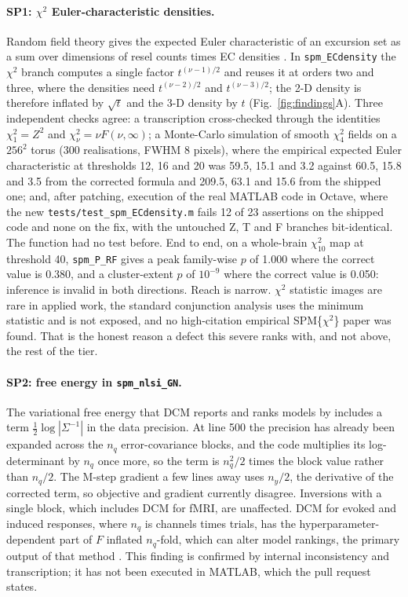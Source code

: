 \documentclass[11pt]{article}
\newcommand{\code}[1]{\texttt{#1}}
\begin{document}
\paragraph{SP1: $\chi^2$ Euler-characteristic densities.} Random field theory gives the expected Euler characteristic of an excursion set as a sum over dimensions of resel counts times EC densities \cite{worsley1994}. In \code{spm\_ECdensity} the $\chi^2$ branch computes a single factor $t^{(\nu-1)/2}$ and reuses it at orders two and three, where the densities need $t^{(\nu-2)/2}$ and $t^{(\nu-3)/2}$; the 2-D density is therefore inflated by $\sqrt t$ and the 3-D density by $t$ (Fig.~\ref{fig:findings}A). Three independent checks agree: a transcription cross-checked through the identities $\chi^2_1 = Z^2$ and $\chi^2_\nu = \nu F(\nu,\infty)$; a Monte-Carlo simulation of smooth $\chi^2_4$ fields on a $256^2$ torus (300 realisations, FWHM 8 pixels), where the empirical expected Euler characteristic at thresholds 12, 16 and 20 was 59.5, 15.1 and 3.2 against 60.5, 15.8 and 3.5 from the corrected formula and 209.5, 63.1 and 15.6 from the shipped one; and, after patching, execution of the real MATLAB code in Octave, where the new \code{tests/test\_spm\_ECdensity.m} fails 12 of 23 assertions on the shipped code and none on the fix, with the untouched Z, T and F branches bit-identical. The function had no test before. End to end, on a whole-brain $\chi^2_{10}$ map at threshold 40, \code{spm\_P\_RF} gives a peak family-wise $p$ of 1.000 where the correct value is 0.380, and a cluster-extent $p$ of $10^{-9}$ where the correct value is 0.050: inference is invalid in both directions. Reach is narrow. $\chi^2$ statistic images are rare in applied work, the standard conjunction analysis uses the minimum statistic and is not exposed, and no high-citation empirical SPM\{$\chi^2$\} paper was found. That is the honest reason a defect this severe ranks with, and not above, the rest of the tier.

\paragraph{SP2: free energy in \code{spm\_nlsi\_GN}.} The variational free energy that DCM reports and ranks models by includes a term $\tfrac12\log|\Sigma^{-1}|$ in the data precision. At line 500 the precision has already been expanded across the $n_q$ error-covariance blocks, and the code multiplies its log-determinant by $n_q$ once more, so the term is $n_q^2/2$ times the block value rather than $n_q/2$. The M-step gradient a few lines away uses $n_y/2$, the derivative of the corrected term, so objective and gradient currently disagree. Inversions with a single block, which includes DCM for fMRI, are unaffected. DCM for evoked and induced responses, where $n_q$ is channels times trials, has the hyperparameter-dependent part of $F$ inflated $n_q$-fold, which can alter model rankings, the primary output of that method \cite{david2006,garrido2007}. This finding is confirmed by internal inconsistency and transcription; it has not been executed in MATLAB, which the pull request states.
\end{document}
